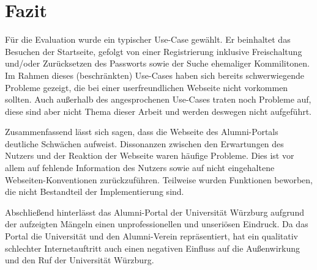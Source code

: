 \section{Fazit}
Für die Evaluation wurde ein typischer Use-Case gewählt. Er beinhaltet das Besuchen der Startseite, gefolgt von einer Registrierung inklusive Freischaltung und/oder Zurücksetzen des Passworts sowie der Suche ehemaliger Kommilitonen. 
Im Rahmen dieses (beschränkten) Use-Cases haben sich bereits schwerwiegende Probleme gezeigt, die bei einer userfreundlichen Webseite nicht vorkommen sollten. 
Auch außerhalb des angesprochenen Use-Cases traten noch Probleme auf, diese sind aber nicht Thema dieser Arbeit und werden deswegen nicht aufgeführt. 

Zusammenfassend lässt sich sagen, dass die Webseite des Alumni-Portals deutliche Schwächen aufweist. Dissonanzen zwischen den Erwartungen des Nutzers und der Reaktion der Webseite waren häufige Probleme. Dies ist vor allem auf fehlende Information des Nutzers sowie auf nicht eingehaltene Webseiten-Konventionen zurückzuführen. Teilweise wurden Funktionen beworben, die nicht Bestandteil der Implementierung sind.

Abschließend hinterlässt das Alumni-Portal der Universität Würzburg aufgrund der aufzeigten Mängeln einen unprofessionellen und unseriösen Eindruck. 
Da das Portal die Universität und den Alumni-Verein repräsentiert, hat ein qualitativ schlechter Internetauftritt auch einen negativen Einfluss auf die Außenwirkung und den Ruf der Universität Würzburg.